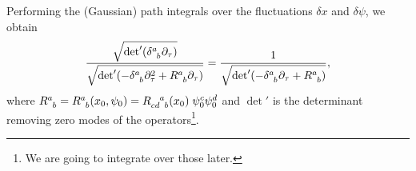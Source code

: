 Performing the (Gaussian) path integrals over the fluctuations $\delta x$ and $\delta \psi$, we obtain
\begin{equation}
  \label{eq:10-zmap}
  \frac{\sqrt{\det'(\delta\indices{^{a}_{b}} \partial_\tau)}}{\sqrt{\det'(-\delta\indices{^{a}_{b}} \partial^2_\tau + R\indices{^{a}_{b}} \partial_\tau)}} = \frac{1}{\sqrt{\det' (-\delta\indices{^{a}_{b}} \partial_\tau + R\indices{^{a}_{b}})}},
\end{equation}
where $R\indices{^{a}_{b}} = R\indices{^{a}_{b}}(x_0, \psi_0) = R\indices{_{cd}^{a}_{b}}(x_0) \; \psi^{c}_0 \psi^{d}_0$ and $\det'$ is the determinant removing zero modes of the operators\footnote{We are going to integrate over those later.}.
